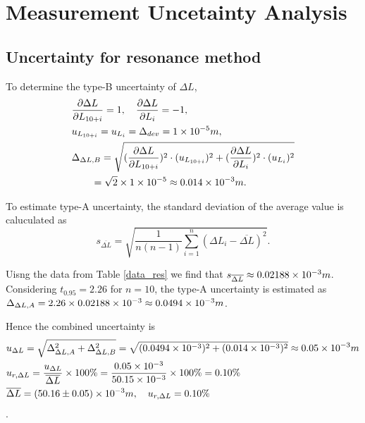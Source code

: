 \section{Measurement Uncetainty Analysis}
\subsection{Uncertainty for resonance method}
    To determine the type-B uncertainty of $\Delta L$,
    \[
    \begin{split}
        &\frac{\partial \Delta L}{\partial L_{10+i}}=1,\quad \frac{\partial \Delta L}{\partial L_i}=-1,\\
        &u_{L_{10+i}}=u_{L_i}=\Delta_{dev}=1\times10^{-5}m,\\
        &\Delta_{\Delta L,B}=\sqrt{(\frac{\partial \Delta L}{\partial L_{10+i}})^2\cdot (u_{L_{10+i}})^2+(\frac{\partial \Delta L}{\partial L_i})^2\cdot (u_{L_i})^2}\\
        &\quad\quad =\sqrt{2}\times 1\times10^{-5}\approx0.014\times10^{-3}m.\\
    \end{split}
    \]

    To estimate type-A uncertainty, the standard deviation of the average value is caluculated as
    \[
        s_{\overline{\Delta L}}=\sqrt{\frac{1}{n(n-1)}\sum_{i=1}^n(\Delta L_i-\overline{\Delta L})^2}.
    \]

    Uisng the data from Table \ref{data_res} we find that $s_{\overline{\Delta L}}\approx 0.02188\times10^{-3}m$. Considering $t_{0.95}=2.26$ for $n=10$, the type-A uncertainty is estimated as $\Delta_{\Delta L,A}=2.26\times0.02188\times10^{-3}\approx 0.0494\times10^{-3}m$.

    Hence the combined uncertainty is 
    \[
    \begin{split}
        &u_{\Delta L}=\sqrt{\Delta_{\Delta L,A}^2+\Delta_{\Delta L,B}^2}=\sqrt{(0.0494\times10^{-3})^2+(0.014\times10^{-3})^2}\approx0.05\times10^{-3}m\\
        &u_{r,\Delta L}=\frac{u_{\Delta L}}{\overline{\Delta L}}\times 100\%=\frac{0.05\times10^{-3}}{50.15\times10^{-3}}\times100\%=0.10\%\\
        &\overline{\Delta L}=(50.16\pm 0.05)\times10^{-3}m,\quad u_{r,\Delta L}=0.10\%
    \end{split}
    \].


